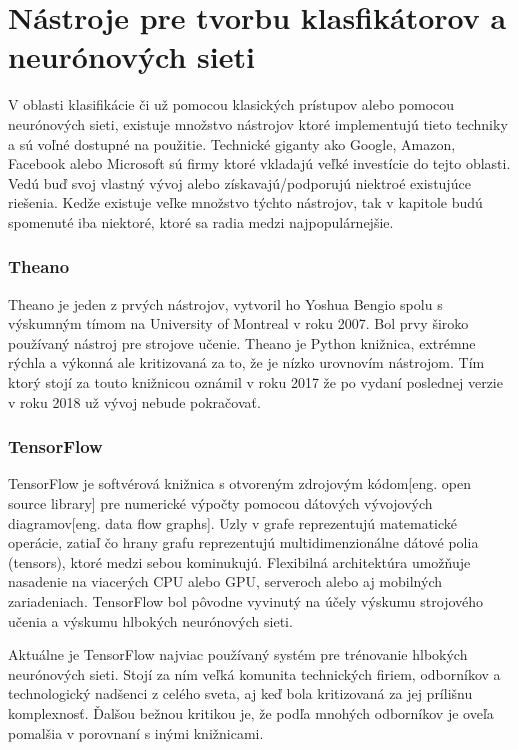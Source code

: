 
\section{Nástroje pre tvorbu klasfikátorov a neurónových sieti}

V oblasti klasifikácie či už pomocou klasických prístupov alebo pomocou neurónových sieti, existuje množstvo nástrojov
    ktoré implementujú tieto techniky a sú voľné dostupné na použitie.
Technické giganty ako Google, Amazon, Facebook alebo Microsoft sú firmy ktoré vkladajú veľké investície do tejto oblasti.
Vedú buď svoj vlastný vývoj alebo získavajú/podporujú niektroé existujúce riešenia.
Kedže existuje veľke množstvo týchto nástrojov, tak v kapitole budú spomenuté iba niektoré, ktoré sa radia medzi najpopulárnejšie\cite{odkaz:FrameworkComparison}.

\subsubsection{Theano}

Theano je jeden z prvých nástrojov, vytvoril ho Yoshua Bengio spolu s výskumným tímom na University of Montreal v roku 2007.
Bol prvy široko používaný nástroj pre strojove učenie.
Theano je Python knižnica, extrémne rýchla a výkonná ale kritizovaná za to, že je nízko urovnovím nástrojom.
Tím ktorý stojí za touto knižnicou oznámil v roku 2017 že po vydaní poslednej verzie v roku 2018 už vývoj nebude pokračovať\cite{odkaz:FrameworkComparison}.

\subsubsection{TensorFlow}

TensorFlow je softvérová knižnica s otvoreným zdrojovým kódom[eng. open source library] pre numerické výpočty pomocou dátových vývojových diagramov[eng. data flow graphs].
Uzly v grafe reprezentujú matematické operácie, zatiaľ čo hrany grafu reprezentujú multidimenzionálne dátové polia (tensors), ktoré medzi sebou kominukujú.
Flexibilná architektúra umožňuje nasadenie na viacerých CPU alebo GPU, serveroch alebo aj mobilných zariadeniach.
TensorFlow bol pôvodne vyvinutý na účely výskumu strojového učenia a výskumu hlbokých neurónových sieti\cite{odkaz:TensorFlow}.

Aktuálne je TensorFlow najviac používaný systém pre trénovanie hlbokých neurónových sieti.
Stojí za ním veľká komunita technických firiem, odborníkov a technologický nadšenci z celého sveta, aj keď bola kritizovaná za jej prílišnu komplexnosť.
Ďalšou bežnou kritikou je, že podľa mnohých odborníkov je oveľa pomalšia v porovnaní s inými knižnicami.

